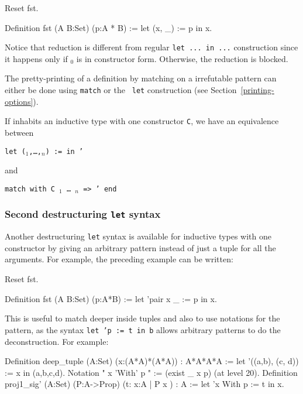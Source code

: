 \begin{coq_eval}
Reset fst.
\end{coq_eval}
\begin{coq_example}
Definition fst (A B:Set) (p:A * B) := let (x, _) := p in x.
\end{coq_example}
Notice that reduction is different from regular {\tt let ... in ...}
construction since it happens only if {\term$_0$} is in constructor
form. Otherwise, the reduction is blocked.

The pretty-printing of a definition by matching on a
irrefutable pattern can either be done using {\tt match} or the {\tt
let} construction (see Section~\ref{printing-options}).

If {\term} inhabits an inductive type with one constructor {\tt C},
we have an equivalence between

{\tt let ({\ident}$_1$,\ldots,{\ident}$_n$) \zeroone{\ifitem} := {\term} in {\term}'}

\noindent and

{\tt match {\term} \zeroone{\ifitem} with C {\ident}$_1$ {\ldots} {\ident}$_n$ \verb!=>! {\term}' end}


\subsubsection{Second destructuring {\tt let} syntax}

Another destructuring {\tt let} syntax is available for inductive types with
one constructor by giving an arbitrary pattern instead of just a tuple
for all the arguments. For example, the preceding example can be written:
\begin{coq_eval}
Reset fst.
\end{coq_eval}
\begin{coq_example}
Definition fst (A B:Set) (p:A*B) := let 'pair x _ := p in x.
\end{coq_example}

This is useful to match deeper inside tuples and also to use notations
for the pattern, as the syntax {\tt let 'p := t in b} allows arbitrary
patterns to do the deconstruction. For example:

\begin{coq_example}
Definition deep_tuple (A:Set) (x:(A*A)*(A*A)) : A*A*A*A :=
  let '((a,b), (c, d)) := x in (a,b,c,d).
Notation " x 'With' p " := (exist _ x p) (at level 20).
Definition proj1_sig' (A:Set) (P:A->Prop) (t:{ x:A | P x }) : A :=
  let 'x With p := t in x.
\end{coq_example}

